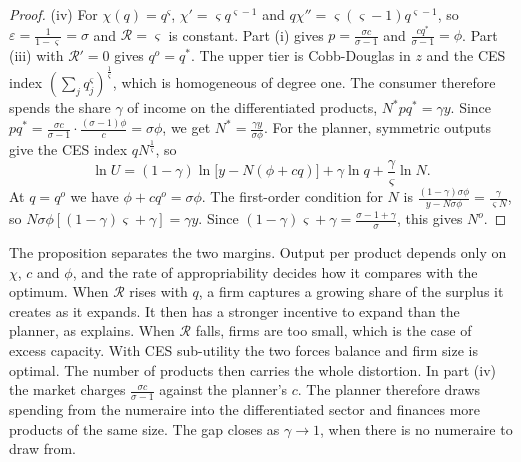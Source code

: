 \begin{proof}
(iv) For $\chi(q) = q^\varsigma$, $\chi' = \varsigma q^{\varsigma - 1}$ and $q\chi'' = \varsigma(\varsigma - 1)q^{\varsigma - 1}$,
so $\varepsilon = \frac{1}{1 - \varsigma} = \sigma$ and $\mathcal{R} = \varsigma$ is constant. Part (i) gives
$p = \frac{\sigma c}{\sigma - 1}$ and $\frac{cq^*}{\sigma - 1} = \phi$. Part (iii) with $\mathcal{R}' = 0$ gives
$q^o = q^*$. The upper tier is Cobb-Douglas in $z$ and the CES index $(\sum_jq_j^\varsigma)^{\frac{1}{\varsigma}}$, which
is homogeneous of degree one. The consumer therefore spends the share $\gamma$ of income on the differentiated
products, $N^*pq^* = \gamma y$. Since $pq^* = \frac{\sigma c}{\sigma - 1}\cdot\frac{(\sigma - 1)\phi}{c} = \sigma\phi$, we get
$N^* = \frac{\gamma y}{\sigma\phi}$. For the planner, symmetric outputs give the CES index $qN^{\frac{1}{\varsigma}}$, so
\begin{equation*}
\ln U = (1 - \gamma)\ln\big[y - N(\phi + cq)\big] + \gamma\ln q + \frac{\gamma}{\varsigma}\ln N .
\end{equation*}
At $q = q^o$ we have $\phi + cq^o = \sigma\phi$. The first-order condition for $N$ is
$\frac{(1 - \gamma)\sigma\phi}{y - N\sigma\phi} = \frac{\gamma}{\varsigma N}$, so $N\sigma\phi[(1 - \gamma)\varsigma + \gamma] = \gamma y$.
Since $(1 - \gamma)\varsigma + \gamma = \frac{\sigma - 1 + \gamma}{\sigma}$, this gives $N^o$.
\end{proof}

The proposition separates the two margins. Output per product depends only on $\chi$, $c$ and $\phi$, and the rate of
appropriability decides how it compares with the optimum. When $\mathcal{R}$ rises with $q$, a firm captures a growing
share of the surplus it creates as it expands. It then has a stronger incentive to expand than the planner, as
\citet[Section 7.5.2]{Tirole1988} explains. When $\mathcal{R}$ falls, firms are too small, which is the case of excess
capacity. With CES sub-utility the two forces balance and firm size is optimal. The number of products then carries
the whole distortion. In part (iv) the market charges $\frac{\sigma c}{\sigma - 1}$ against the planner's $c$. The
planner therefore draws spending from the numeraire into the differentiated sector and finances more products of the
same size. The gap closes as $\gamma \to 1$, when there is no numeraire to draw from.

